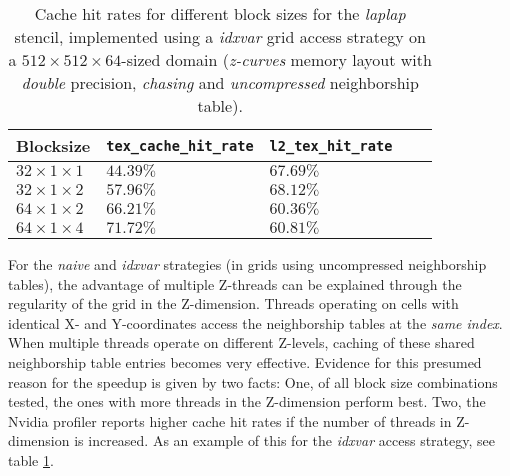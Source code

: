 \begin{table}
	\begin{center}
    \begin{tabular}{l l l p{2cm} p{2cm}}
        \hline
        \textbf{Blocksize} & \textbf{\texttt{tex\_\allowbreak cache\_\allowbreak hit\_\allowbreak rate}} & \textbf{\texttt{l2\_\allowbreak tex\_\allowbreak hit\_\allowbreak rate}} \\
        \hline
        \hline
        $32\times 1\times 1$ & $44.39\%$ & $67.69\%$ \\
        $32\times 1\times 2$ & $57.96\%$ & $68.12\%$ \\
        $64\times 1\times 2$ & $66.21\%$ & $60.36\%$ \\
        $64\times 1\times 4$ & $71.72\%$ & $60.81\%$ \\
        \hline
    \end{tabular}
	\end{center}
    \caption{\label{tab:laplap-blocksize-metrics} Cache hit rates for different block sizes for the \emph{laplap} stencil, implemented using a \emph{idxvar} grid access strategy on a $512\times 512\times 64$-sized domain (\emph{z-curves} memory layout with \emph{double} precision, \emph{chasing} and \emph{uncompressed} neighborship table).}
\end{table}

For the \emph{naive} and \emph{idxvar} strategies (in grids using uncompressed neighborship tables), the advantage of multiple Z-threads can be explained through the regularity of the grid in the Z-dimension. Threads operating on cells with identical X- and Y-coordinates access the neighborship tables at the \emph{same index}. When multiple threads operate on different Z-levels, caching of these shared neighborship table entries becomes very effective. Evidence for this presumed reason for the speedup is given by two facts: One, of all block size combinations tested, the ones with more threads in the Z-dimension perform best. Two, the Nvidia profiler reports higher cache hit rates if the number of threads in Z-dimension is increased. As an example of this for the \emph{idxvar} access strategy, see table \ref{tab:laplap-blocksize-metrics}.

